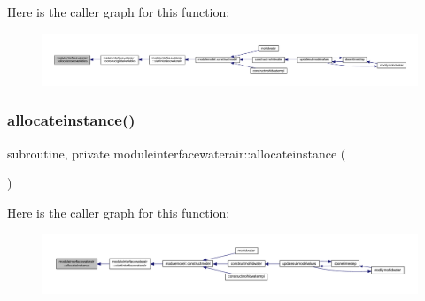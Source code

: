 Here is the caller graph for this function\+:\nopagebreak
\begin{figure}[H]
\begin{center}
\leavevmode
\includegraphics[width=350pt]{namespacemoduleinterfacewaterair_ad1e0a14ea6e30cf93be9661a4a71a0f7_icgraph}
\end{center}
\end{figure}
\mbox{\label{namespacemoduleinterfacewaterair_aac230f23ec15f17b04185abc9c918ba1}} 
\subsubsection{\texorpdfstring{allocateinstance()}{allocateinstance()}}
{\footnotesize\ttfamily subroutine, private moduleinterfacewaterair\+::allocateinstance (\begin{DoxyParamCaption}{ }\end{DoxyParamCaption})\hspace{0.3cm}{\ttfamily [private]}}

Here is the caller graph for this function\+:\nopagebreak
\begin{figure}[H]
\begin{center}
\leavevmode
\includegraphics[width=350pt]{namespacemoduleinterfacewaterair_aac230f23ec15f17b04185abc9c918ba1_icgraph}
\end{center}
\end{figure}
\mbox{\label{namespacemoduleinterfacewaterair_adca22635eac17186131c131155bfb929}} 
